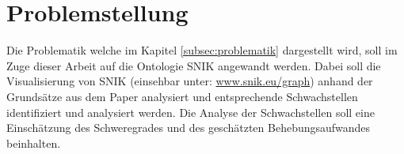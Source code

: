 	\section{Problemstellung}
	\label{subsec:problemstellung}
		Die Problematik welche im Kapitel \ref{subsec:problematik} dargestellt wird, soll im Zuge dieser Arbeit auf die Ontologie \ac{SNIK} angewandt werden. Dabei soll die Visualisierung von \ac{SNIK} (einsehbar unter: \href{www.snik.eu/graph}{www.snik.eu/graph}) anhand der Grundsätze aus dem Paper analysiert und entsprechende Schwachstellen identifiziert und analysiert werden. Die Analyse der Schwachstellen soll eine Einschätzung des Schweregrades und des geschätzten Behebungsaufwandes beinhalten.